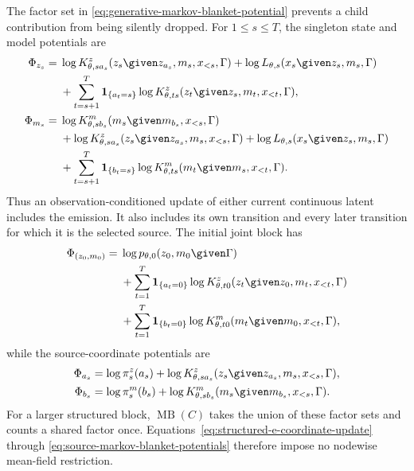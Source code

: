 The factor set in \cref{eq:generative-markov-blanket-potential} prevents a child contribution from being silently dropped. For $1\leq s\leq T$, the singleton state and model potentials are
\begin{equation}
\begin{aligned}
\Phi_{z_s}
={}&\log K^z_{\theta,sa_s}
(z_s\given z_{a_s},m_s,x_{<s},\Gamma)
+\log L_{\theta,s}(x_s\given z_s,m_s,\Gamma)\\
&+\sum_{t=s+1}^{T}\mathbf 1_{\{a_t=s\}}
\log K^z_{\theta,ts}
(z_t\given z_s,m_t,x_{<t},\Gamma),\\
\Phi_{m_s}
={}&\log K^m_{\theta,sb_s}
(m_s\given m_{b_s},x_{<s},\Gamma)\\
&+\log K^z_{\theta,sa_s}
(z_s\given z_{a_s},m_s,x_{<s},\Gamma)
+\log L_{\theta,s}(x_s\given z_s,m_s,\Gamma)\\
&+\sum_{t=s+1}^{T}\mathbf 1_{\{b_t=s\}}
\log K^m_{\theta,ts}
(m_t\given m_s,x_{<t},\Gamma).
\end{aligned}
\label{eq:state-model-markov-blanket-potentials}
\end{equation}
Thus an observation-conditioned update of either current continuous latent includes the emission. It also includes its own transition and every later transition for which it is the selected source. The initial joint block has
\begin{equation}
\begin{aligned}
\Phi_{(z_0,m_0)}
={}&\log p_{\theta,0}(z_0,m_0\given\Gamma)\\
&+\sum_{t=1}^{T}\mathbf 1_{\{a_t=0\}}
\log K^z_{\theta,t0}(z_t\given z_0,m_t,x_{<t},\Gamma)\\
&+\sum_{t=1}^{T}\mathbf 1_{\{b_t=0\}}
\log K^m_{\theta,t0}(m_t\given m_0,x_{<t},\Gamma),
\end{aligned}
\label{eq:initial-block-markov-blanket-potential}
\end{equation}
while the source-coordinate potentials are
\begin{equation}
\begin{aligned}
\Phi_{a_s}
&=\log\pi_s^z(a_s)
+\log K^z_{\theta,sa_s}
(z_s\given z_{a_s},m_s,x_{<s},\Gamma),\\
\Phi_{b_s}
&=\log\pi_s^m(b_s)
+\log K^m_{\theta,sb_s}
(m_s\given m_{b_s},x_{<s},\Gamma).
\end{aligned}
\label{eq:source-markov-blanket-potentials}
\end{equation}
For a larger structured block, $\operatorname{MB}(C)$ takes the union of these factor sets and counts a shared factor once. Equations~\eqref{eq:structured-e-coordinate-update} through \eqref{eq:source-markov-blanket-potentials} therefore impose no nodewise mean-field restriction.

